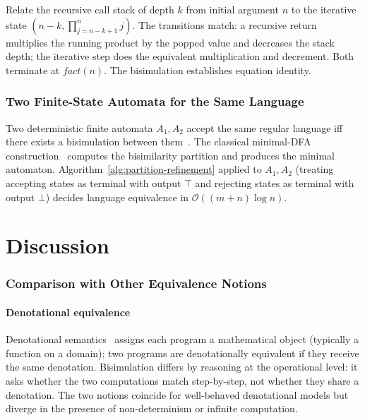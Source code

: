 \documentclass[twocolumn,11pt,a4paper]{article}
\begin{document}
Relate the recursive call stack of depth $k$ from initial argument $n$ to the iterative state $(n - k, \prod_{j=n-k+1}^{n} j)$. The transitions match: a recursive return multiplies the running product by the popped value and decreases the stack depth; the iterative step does the equivalent multiplication and decrement. Both terminate at $\mathit{fact}(n)$. The bisimulation establishes equation identity.

\section{Two Finite-State Automata for the Same Language}
\label{sec:automata-example}

Two deterministic finite automata $A_1, A_2$ accept the same regular language iff there exists a bisimulation between them~\citep{hopcroft1979introduction}. The classical minimal-DFA construction~\citep{hopcroft1971nlogn} computes the bisimilarity partition and produces the minimal automaton. Algorithm~\ref{alg:partition-refinement} applied to $A_1, A_2$ (treating accepting states as terminal with output $\top$ and rejecting states as terminal with output $\bot$) decides language equivalence in $\mathcal{O}((m+n)\log n)$.

\part{Discussion}

\section{Comparison with Other Equivalence Notions}
\label{sec:comparison}

\subsection{Denotational equivalence}

Denotational semantics~\citep{scott1971toward,winskel1993formal} assigns each program a mathematical object (typically a function on a domain); two programs are denotationally equivalent if they receive the same denotation. Bisimulation differs by reasoning at the operational level: it asks whether the two computations match step-by-step, not whether they share a denotation. The two notions coincide for well-behaved denotational models but diverge in the presence of non-determinism or infinite computation.
\end{document}
